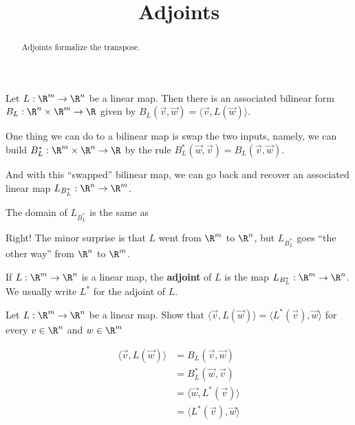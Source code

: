 \documentclass{ximera}
\title{Adjoints}
\begin{document}
\begin{abstract}
  Adjoints formalize the transpose.
\end{abstract}
	
Let $L: \R^m \to \R^n$ be a linear map.  Then there is an associated
bilinear form $B_L : \R^n \times \R^m \to \R$ given by
$B_L(\vec{v},\vec{w}) = \langle \vec{v}, L(\vec{w}) \rangle$.

One thing we can do to a bilinear map is swap the two inputs, namely,
we can build $B_L^*: \R^m \times \R^n \to \R$ by the rule $B_L^*
(\vec{w},\vec{v}) = B_L(\vec{v},\vec{w})$.

And with this ``swapped'' bilinear map, we can go back and recover an
associated linear map $L_{B_L^*} : \R^n \to \R^m$.

\begin{question}
  The domain of $L_{B_L^*}$ is the same as
  \begin{solution}
    \begin{multiple-choice}
    \end{multiple-choice}
  \end{solution}

  Right!  The minor surprise is that $L$ went from $\R^m$ to $\R^n$, but $L_{B_L^*}$ goes ``the other way'' from $\R^n$ to $\R^m$.
\end{question}


\begin{definition}
  If $L:\R^m \to \R^n$ is a linear map, the \textbf{adjoint} of $L$ is
  the map $L_{B_L^*} : \R^m \to \R^n$.  We usually write $L^*$ for the
  adjoint of $L$.
\end{definition}
		
Let $L: \R^m \to \R^n$ be a linear map.  
Show that $\langle \vec{v}, L(\vec{w})\rangle = \langle  L^*(\vec{v}),\vec{w}\rangle$ for every $v \in \R^n$ and $w \in \R^m$
\begin{free-response}
  \begin{align*}
    \langle \vec{v}, L(\vec{w})\rangle &= B_L(\vec{v},\vec{w})\\
    &= B_L^*(\vec{w},\vec{v})\\
    &=\langle \vec{w},L^*(\vec{v}) \rangle\\
    &=\langle L^*(\vec{v}), \vec{w}\rangle
  \end{align*}
\end{free-response}
\end{document}
